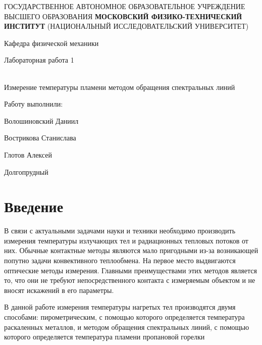\documentclass[12pt,a4paper]{article}
\author{Глотов Алексей}
\begin{document}
\newpage
\begin{center}
\footnotesize{{ГОСУДАРСТВЕННОЕ АВТОНОМНОЕ ОБРАЗОВАТЕЛЬНОЕ УЧРЕЖДЕНИЕ}\break
{ВЫСШЕГО ОБРАЗОВАНИЯ}
\break
{\bf {МОСКОВСКИЙ ФИЗИКО-ТЕХНИЧЕСКИЙ ИНСТИТУТ}}
\break
\small{(НАЦИОНАЛЬНЫЙ ИССЛЕДОВАТЕЛЬСКИЙ УНИВЕРСИТЕТ)}}
\break
\hfill \break
\hfill \break
\begin{center}
\Large{Кафедра физической механики }
\end{center}
\hfill \break
\hfill \break
\hfill \break
\hfill \break

\begin{center}
\Large {Лабораторная работа 1}
\end{center}
\hfill \break\\
\large{Измерение температуры пламени методом обращения спектральных линий}
\end{center}
\hfill \break
\hfill \break
\hfill \break
\hfill \break
\hfill \break
\hfill \break
\hfill \break
\hfill \break
\hfill \break
\hfill \break

\begin{flushright}
{Работу выполнили:}

Волошиновский Даниил

Вострикова Станислава

Глотов Алексей
\end{flushright}

\hfill \break
\hfill \break
\hfill \break
\hfill \break
\hfill \break
\hfill \break
\hfill \break
\hfill \break
\hfill \break
\hfill \break
\hfill \break

\begin{center}
Долгопрудный 
\end{center}
\thispagestyle{empty}
\newpage
\section{Введение}

\par В связи с актуальными задачами науки и техники необходимо производить измерения температуры излучающих тел и радиационных тепловых потоков от них. Обычные контактные методы являются мало пригодными из-за возникающей попутно задачи конвективного теплообмена. На первое место выдвигаются оптические методы измерения. Главными преимуществами этих методов является то, что они не требуют непосредственного контакта с измеряемым объектом и не вносят искажений в его параметры. 
\par В данной работе измерения температуры нагретых тел производятся двумя способами: пирометрическим, с помощью которого определяется температура раскаленных металлов, и методом обращения спектральных линий, с помощью которого определяется температура пламени пропановой горелки
\end{document}
